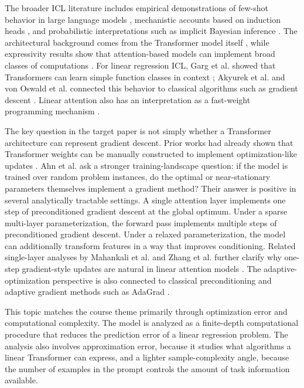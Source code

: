 \documentclass[conference]{IEEEtran}
\begin{document}
The broader ICL literature includes empirical demonstrations of few-shot behavior in large language models \cite{brown2020language}, mechanistic accounts based on induction heads \cite{olsson2022context}, and probabilistic interpretations such as implicit Bayesian inference \cite{xie2022bayesian}. The architectural background comes from the Transformer model itself \cite{vaswani2017attention}, while expressivity results show that attention-based models can implement broad classes of computations \cite{perez2021attention,wei2022statistically}. For linear regression ICL, Garg et al. showed that Transformers can learn simple function classes in context \cite{garg2022can}; Akyurek et al. and von Oswald et al. connected this behavior to classical algorithms such as gradient descent \cite{akyurek2023learning,von2023transformers}. Linear attention also has an interpretation as a fast-weight programming mechanism \cite{schlag2021linear}.

The key question in the target paper is not simply whether a Transformer architecture can represent gradient descent. Prior works had already shown that Transformer weights can be manually constructed to implement optimization-like updates \cite{akyurek2023learning,von2023transformers}. Ahn et al. ask a stronger training-landscape question: if the model is trained over random problem instances, do the optimal or near-stationary parameters themselves implement a gradient method? Their answer is positive in several analytically tractable settings. A single attention layer implements one step of preconditioned gradient descent at the global optimum. Under a sparse multi-layer parameterization, the forward pass implements multiple steps of preconditioned gradient descent. Under a relaxed parameterization, the model can additionally transform features in a way that improves conditioning. Related single-layer analyses by Mahankali et al. and Zhang et al. further clarify why one-step gradient-style updates are natural in linear attention models \cite{mahankali2023one,zhang2023trained}. The adaptive-optimization perspective is also connected to classical preconditioning and adaptive gradient methods such as AdaGrad \cite{duchi2011adaptive}.

This topic matches the course theme primarily through optimization error and computational complexity. The model is analyzed as a finite-depth computational procedure that reduces the prediction error of a linear regression problem. The analysis also involves approximation error, because it studies what algorithms a linear Transformer can express, and a lighter sample-complexity angle, because the number of examples in the prompt controls the amount of task information available.
\end{document}
